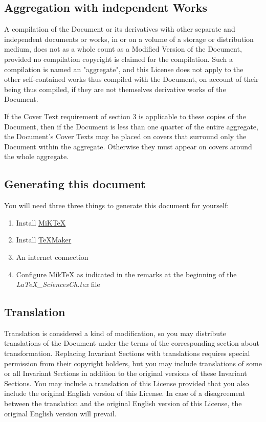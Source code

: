 	\subsection{Aggregation with independent Works} 
	A compilation of the Document or its derivatives with other separate and independent documents or works, in or on a volume of a storage or distribution medium, does not as a whole count as a Modified Version of the Document, provided no compilation copyright is claimed for the compilation. Such a compilation is named an "aggregate", and this License does not apply to the other self-contained works thus compiled with the Document, on account of their being thus compiled, if they are not themselves derivative works of the Document. 

	If the Cover Text requirement of section 3 is applicable to these copies of the Document, then if the Document is less than one quarter of the entire aggregate, the Document's Cover Texts may be placed on covers that surround only the Document within the aggregate. Otherwise they must appear on covers around the whole aggregate. 
	
	\subsection{Generating this document}
	You will need three three things to generate this document for yourself:
	\begin{enumerate}
		\item Install \href{https://miktex.org/}{MiKTeX}

		\item Install \href{http://www.xm1math.net/texmaker/index_fr.html}{TeXMaker}

		\item An internet connection

		\item Configure MikTeX as indicated in the remarks at the beginning of the \textit{LaTeX\_SciencesCh.tex} file
	\end{enumerate}

	\subsection{Translation}
	Translation is considered a kind of modification, so you may distribute translations of the Document under the terms of the corresponding section about transformation. Replacing Invariant Sections with translations requires special permission from their copyright holders, but you may include translations of some or all Invariant Sections in addition to the original versions of these Invariant Sections. You may include a translation of this License provided that you also include the original English version of this License. In case of a disagreement between the translation and the original English version of this License, the original English version will prevail. 

